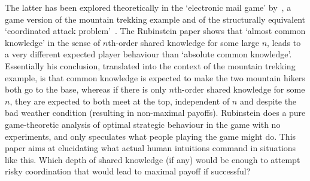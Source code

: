 \documentclass[twocolumn,a4paper,superscriptaddress,nofootinbib]{revtex4}
\begin{document}
The latter has been explored theoretically in the  `electronic mail game' by~\citet{rubinstein1989electronic}, a game version of the mountain trekking example and of the structurally equivalent `coordinated attack problem'~\citep{fagin1995reasoning}. The Rubinstein paper shows that `almost common knowledge' in the sense of $n$th-order shared knowledge for some large $n$, leads to a very different expected player behaviour than `absolute common knowledge'. Essentially his conclusion, translated into the context of the mountain trekking example, is that common knowledge is expected to make the two mountain hikers both go to the base, whereas if there is only $n$th-order shared knowledge for some $n$, they are expected to both meet at the top, independent of $n$ and despite the bad weather condition (resulting in non-maximal payoffs). Rubinstein does a pure game-theoretic analysis of optimal strategic behaviour in the game with no experiments, and only speculates what people playing the game might do. This paper aims at elucidating what actual human intuitions command in situations like this. Which depth of shared knowledge (if any) would be enough to attempt risky coordination that would lead to maximal payoff if successful? 
\end{document}
